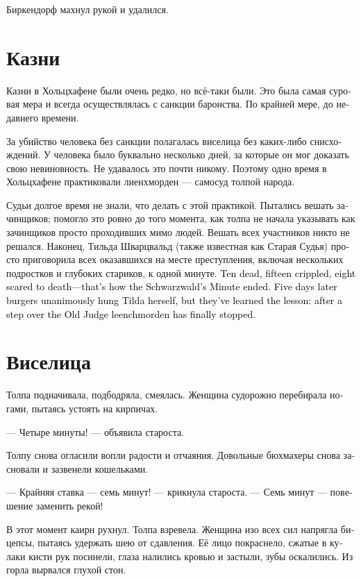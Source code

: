 \documentclass[a4paper,12pt,fleqn]{book}\usepackage{cooltooltips}\usepackage{polyglossia}\setdefaultlanguage[babelshorthands=true]{russian}\setotherlanguage{english}\defaultfontfeatures{Ligatures=TeX,Mapping=tex-text} \usepackage{xcolor}\definecolor{lightgray}{HTML}{bbbbbb}\color{lightgray}\newcommand{\ml}[3]{\textenglish{\textcolor{black}{#3}}}
\begin{document}
Биркендорф махнул рукой и удалился.

\section{Казни}

Казни в Хольцхафене были очень редко, но всё-таки были.
Это была самая суровая мера и всегда осуществлялась с санкции баронства.
По крайней мере, до недавнего времени.

За убийство человека без санкции полагалась виселица без каких-либо снисхождений.
У человека было буквально несколько дней, за которые он мог доказать свою невиновность.
Не удавалось это почти никому.
Поэтому одно время в Хольцхафене практиковали лиенхморден --- самосуд толпой народа.

Судьи долгое время не знали, что делать с этой практикой.
Пытались вешать зачинщиков;
помогло это ровно до того момента, как толпа не начала указывать как зачинщиков просто проходивших мимо людей.
Вешать всех участников никто не решался.
Наконец, Тильда Шварцвальд (также известная как Старая Судья) просто приговорила всех оказавшихся на месте преступления, включая нескольких подростков и глубоких стариков, к одной минуте.
\ml{$0$}
{Десять трупов, пятнадцать искалеченных, восемь испуганных до смерти --- таков был результат <<минутования Шварцвальд>>.}
{Ten dead, fifteen crippled, eight scared to death---that's how the Schwarzwald's Minute ended.}
\ml{$0$}
{Спустя пять дней горожане единодушно повесили саму Тильду, но урок усвоили --- на Старой Судье лиенхморден наконец прекратился.}
{Five days later burgers unanimously hung Tilda herself, but they've learned the lesson: after a step over the Old Judge leenchmorden has finally stopped.}

\section{Виселица}

Толпа подначивала, подбодряла, смеялась.
Женщина судорожно перебирала ногами, пытаясь устоять на кирпичах.

--- Четыре минуты! --- объявила староста.

Толпу снова огласили вопли радости и отчаяния.
Довольные бюхмахеры снова засновали и зазвенели кошельками.

--- Крайняя ставка --- семь минут! --- крикнула староста.
--- Семь минут --- повешение заменить рекой!

В этот момент каирн рухнул.
Толпа взревела.
Женщина изо всех сил напрягла бицепсы, пытаясь удержать шею от сдавления.
Её лицо покраснело, сжатые в кулаки кисти рук посинели, глаза налились кровью и застыли, зубы оскалились.
Из горла вырвался глухой стон.
\end{document}
